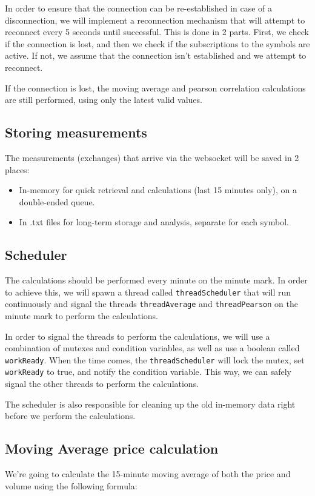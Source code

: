 \documentclass{article}
\begin{document}
In order to ensure that the connection can be re-established in case of a disconnection, we will implement a reconnection 
mechanism that will attempt to reconnect every 5 seconds until successful. This is done in 2 parts. First, we
check if the connection is lost, and then we check if the subscriptions to the symbols are active. If not, we assume 
that the connection isn't established and we attempt to reconnect.

If the connection is lost, the moving average and pearson correlation calculations are still performed,
using only the latest valid values.


\subsection{Storing measurements}
The measurements (exchanges) that arrive via the websocket will be saved in 2 places:
\begin{itemize}
    \item In-memory for quick retrieval and calculations (last 15 minutes only), on a double-ended queue.
    \item In .txt files for long-term storage and analysis, separate for each symbol.
\end{itemize}

\subsection{Scheduler}
The calculations should be performed every minute on the minute mark. In order to achieve this, we will spawn
a thread called \texttt{threadScheduler} that will run continuously and signal the threads \texttt{threadAverage}
and \texttt{threadPearson} on the minute mark to perform the calculations.

In order to signal the threads to perform the calculations, we will use a combination of mutexes and condition variables, as
well as use a boolean called \texttt{workReady}. When the time comes, the \texttt{threadScheduler} will lock the mutex, 
set \texttt{workReady} to true, and notify the condition variable. This way, we can safely signal the other threads 
to perform the calculations.

The scheduler is also responsible for cleaning up the old in-memory data right before we perform the calculations.


\subsection{Moving Average price calculation}
We're going to calculate the 15-minute moving average of both the price and volume using the following formula:
\end{document}
